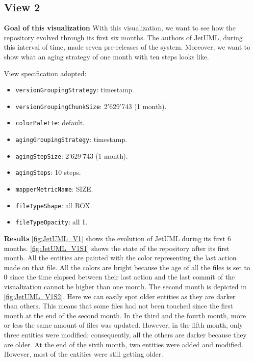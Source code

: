 \subsection{View 2}
\textbf{Goal of this visualization}
With this visualization, we want to see how the repository evolved through its first six months. 
The authors of JetUML, during this interval of time, made seven pre-releases of the system. 
Moreover, we want to show what an aging strategy of one month with ten steps looks like. 

\bigbreak
View specification adopted: 
\begin{itemize}
    \item \texttt{versionGroupingStrategy}: timestamp.
    \item \texttt{versionGroupingChunkSize}: 2'629'743 (1 month). 
    \item \texttt{colorPalette}: default.
    \item \texttt{agingGroupingStrategy}: timestamp.
    \item \texttt{agingStepSize}: 2'629'743 (1 month).
    \item \texttt{agingSteps}: 10 steps.
    \item \texttt{mapperMetricName}: SIZE. 
    \item \texttt{fileTypeShape}: all BOX. 
    \item \texttt{fileTypeOpacity}: all 1. 
\end{itemize}

\textbf{Results}
\autoref{fig:JetUML_V1} shows the evolution of JetUML during its first 6 months. \autoref{fig:JetUML_V1S1} shows the state of the repository after its first month. All the entities are painted with the color representing the last action made on that file. All the colors are bright because the age of all the files is set to 0 since the time elapsed between their last action and the last commit of the visualization cannot be higher than one month. The second month is depicted in \autoref{fig:JetUML_V1S2}. Here we can easily spot older entities as they are darker than others. This means that some files had not been touched since the first month at the end of the second month. In the third and the fourth month, more or less the same amount of files was updated. However, in the fifth month, only three entities were modified; consequently, all the others are darker because they are older. 
At the end of the sixth month, two entities were added and modified. However, most of the entities were still getting older. 

